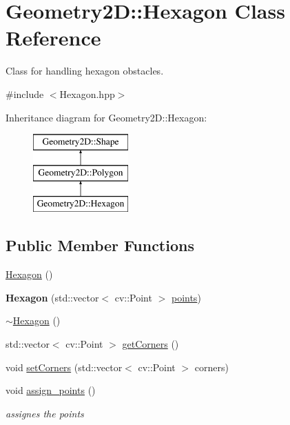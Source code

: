 \hypertarget{class_geometry2_d_1_1_hexagon}{}\section{Geometry2D\+:\+:Hexagon Class Reference}
\label{class_geometry2_d_1_1_hexagon}


Class for handling hexagon obstacles.  




{\ttfamily \#include $<$Hexagon.\+hpp$>$}

Inheritance diagram for Geometry2D\+:\+:Hexagon\+:\begin{figure}[H]
\begin{center}
\leavevmode
\includegraphics[height=3.000000cm]{class_geometry2_d_1_1_hexagon}
\end{center}
\end{figure}
\subsection*{Public Member Functions}
\begin{DoxyCompactItemize}
\item 
\mbox{\hyperlink{class_geometry2_d_1_1_hexagon_a5f151d8d0cb83ff62bb13196a0101a9e}{Hexagon}} ()
\item 
\mbox{\label{class_geometry2_d_1_1_hexagon_add79e7752001e4c5c20e1a1e05672f56}} 
{\bfseries Hexagon} (std\+::vector$<$ cv\+::\+Point $>$ \mbox{\hyperlink{class_geometry2_d_1_1_polygon_ab965e028324c2199022da00ff7eef14b}{points}})
\item 
\mbox{\hyperlink{class_geometry2_d_1_1_hexagon_aa16b14ea33395f3ec9ee58208c88eb1b}{$\sim$\+Hexagon}} ()
\item 
std\+::vector$<$ cv\+::\+Point $>$ \mbox{\hyperlink{class_geometry2_d_1_1_hexagon_ad72b9382bd173efc5aad346e7af074a0}{get\+Corners}} ()
\item 
void \mbox{\hyperlink{class_geometry2_d_1_1_hexagon_ab1557df2a9a0092e5cc23ff32f5f25bc}{set\+Corners}} (std\+::vector$<$ cv\+::\+Point $>$ corners)
\item 
\mbox{\label{class_geometry2_d_1_1_hexagon_aa14a1979642db0e7a94ff0f9b59c7168}} 
void \mbox{\hyperlink{class_geometry2_d_1_1_hexagon_aa14a1979642db0e7a94ff0f9b59c7168}{assign\+\_\+points}} ()
\begin{DoxyCompactList}\small\item\em assignes the points \end{DoxyCompactList}\end{DoxyCompactItemize}
